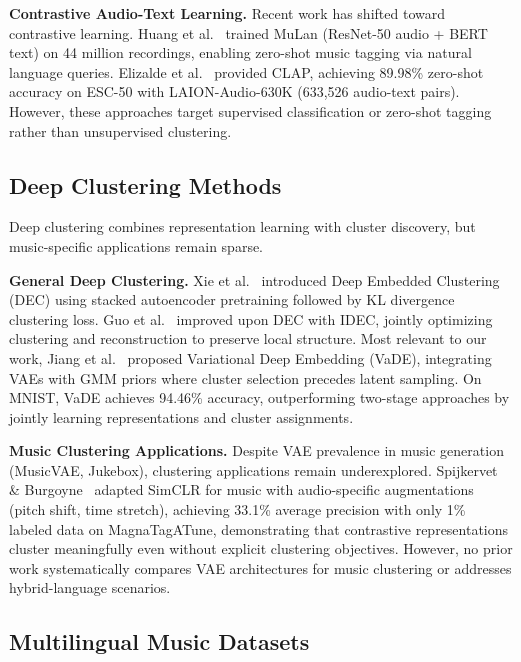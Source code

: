\documentclass[10pt,twocolumn]{article}
\begin{document}
\textbf{Contrastive Audio-Text Learning.} Recent work has shifted toward contrastive learning. Huang et al.~\cite{huang2022mulan} trained MuLan (ResNet-50 audio + BERT text) on 44 million recordings, enabling zero-shot music tagging via natural language queries. Elizalde et al.~\cite{elizalde2023clap} provided CLAP, achieving 89.98\% zero-shot accuracy on ESC-50 with LAION-Audio-630K (633,526 audio-text pairs). However, these approaches target supervised classification or zero-shot tagging rather than unsupervised clustering.

\subsection{Deep Clustering Methods}

Deep clustering combines representation learning with cluster discovery, but music-specific applications remain sparse.

\textbf{General Deep Clustering.} Xie et al.~\cite{xie2016dec} introduced Deep Embedded Clustering (DEC) using stacked autoencoder pretraining followed by KL divergence clustering loss. Guo et al.~\cite{guo2017idec} improved upon DEC with IDEC, jointly optimizing clustering and reconstruction to preserve local structure. Most relevant to our work, Jiang et al.~\cite{jiang2017variational} proposed Variational Deep Embedding (VaDE), integrating VAEs with GMM priors where cluster selection precedes latent sampling. On MNIST, VaDE achieves 94.46\% accuracy, outperforming two-stage approaches by jointly learning representations and cluster assignments.

\textbf{Music Clustering Applications.} Despite VAE prevalence in music generation (MusicVAE, Jukebox), clustering applications remain underexplored. Spijkervet \& Burgoyne~\cite{spijkervet2021clmr} adapted SimCLR for music with audio-specific augmentations (pitch shift, time stretch), achieving 33.1\% average precision with only 1\% labeled data on MagnaTagATune, demonstrating that contrastive representations cluster meaningfully even without explicit clustering objectives. However, no prior work systematically compares VAE architectures for music clustering or addresses hybrid-language scenarios.

\subsection{Multilingual Music Datasets}
\end{document}
